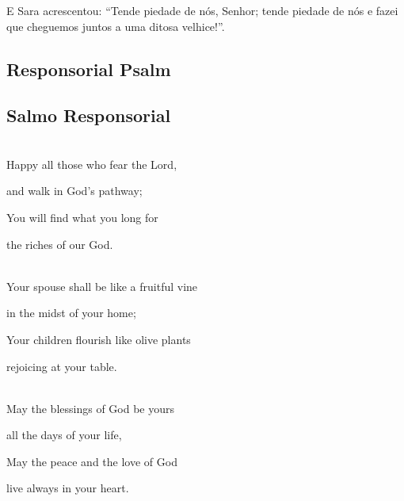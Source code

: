 \documentclass[10pt,a5]{article}
\newcommand \subsect[2] {\subsection*{#1} \switchcolumn \subsection*{#2} \switchcolumn*}
\begin{document}
\begin{paracol}{2}
E Sara acrescentou: “Tende piedade de nós, Senhor; tende piedade de nós e fazei que cheguemos juntos a uma ditosa velhice!”.


 \switchcolumn*

 \subsect{Responsorial Psalm}{Salmo Responsorial}

 \\

 Happy all those who fear the Lord,

 \hspace*{2em}and walk in God's pathway;

You will find what you long for

 \hspace*{2em}the riches of our God.

 \\

 Your spouse shall be like a fruitful vine

 \hspace*{2em}in the midst of your home;

 Your children flourish like olive plants

 \hspace*{2em}rejoicing at your table.

 \\

May the blessings of God be yours

 \hspace*{2em}all the days of your life,

 May the peace and the love of God

 \hspace*{2em}live always in your heart.

 \\


\switchcolumn

\\
\\


\end{paracol}
\end{document}
